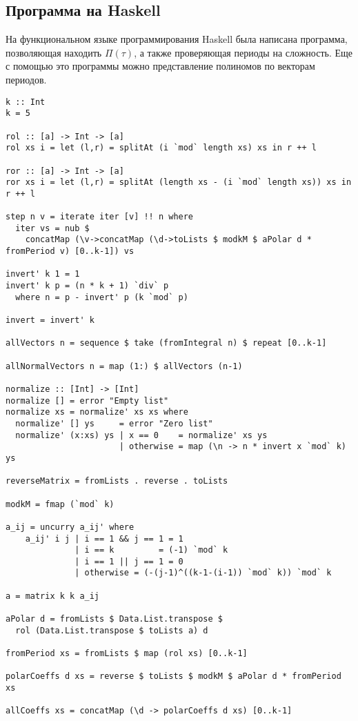 \documentclass[bibliography=totoc, a4paper, 14pt]{extarticle}
\begin{document}
\subsection{Программа на Haskell}
На функциональном языке программирования Haskell была написана программа, позволяющая находить
$\Pi(\tau)$, а также проверяющая периоды на сложность. Еще с помощью это программы можно
представление полиномов по векторам периодов.

\begin{footnotesize}
\begin{verbatim}
k :: Int
k = 5

rol :: [a] -> Int -> [a]
rol xs i = let (l,r) = splitAt (i `mod` length xs) xs in r ++ l

ror :: [a] -> Int -> [a]
ror xs i = let (l,r) = splitAt (length xs - (i `mod` length xs)) xs in r ++ l

step n v = iterate iter [v] !! n where
  iter vs = nub $ 
    concatMap (\v->concatMap (\d->toLists $ modkM $ aPolar d * fromPeriod v) [0..k-1]) vs

invert' k 1 = 1
invert' k p = (n * k + 1) `div` p
  where n = p - invert' p (k `mod` p)

invert = invert' k

allVectors n = sequence $ take (fromIntegral n) $ repeat [0..k-1]

allNormalVectors n = map (1:) $ allVectors (n-1)

normalize :: [Int] -> [Int]
normalize [] = error "Empty list"
normalize xs = normalize' xs xs where
  normalize' [] ys     = error "Zero list"
  normalize' (x:xs) ys | x == 0    = normalize' xs ys
                       | otherwise = map (\n -> n * invert x `mod` k) ys

reverseMatrix = fromLists . reverse . toLists

modkM = fmap (`mod` k)

a_ij = uncurry a_ij' where
    a_ij' i j | i == 1 && j == 1 = 1
              | i == k         = (-1) `mod` k
              | i == 1 || j == 1 = 0
              | otherwise = (-(j-1)^((k-1-(i-1)) `mod` k)) `mod` k

a = matrix k k a_ij

aPolar d = fromLists $ Data.List.transpose $
  rol (Data.List.transpose $ toLists a) d

fromPeriod xs = fromLists $ map (rol xs) [0..k-1]

polarCoeffs d xs = reverse $ toLists $ modkM $ aPolar d * fromPeriod xs

allCoeffs xs = concatMap (\d -> polarCoeffs d xs) [0..k-1]


\end{verbatim}
\end{footnotesize}
\end{document}
